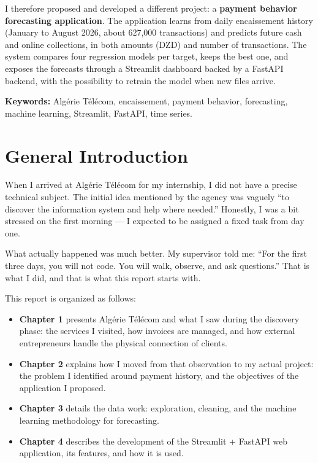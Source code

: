 \documentclass[12pt,a4paper]{report}
\begin{document}
I therefore proposed and developed a different project: a \textbf{payment behavior forecasting application}. The application learns from daily encaissement history (January to August 2026, about 627,000 transactions) and predicts future cash and online collections, in both amounts (DZD) and number of transactions. The system compares four regression models per target, keeps the best one, and exposes the forecasts through a Streamlit dashboard backed by a FastAPI backend, with the possibility to retrain the model when new files arrive.

\textbf{Keywords:} Algérie Télécom, encaissement, payment behavior, forecasting, machine learning, Streamlit, FastAPI, time series.

\tableofcontents
\listoffigures
\listoftables

\chapter{General Introduction}

When I arrived at Algérie Télécom for my internship, I did not have a precise technical subject. The initial idea mentioned by the agency was vaguely ``to discover the information system and help where needed.'' Honestly, I was a bit stressed on the first morning --- I expected to be assigned a fixed task from day one.

What actually happened was much better. My supervisor told me: ``For the first three days, you will not code. You will walk, observe, and ask questions.'' That is what I did, and that is what this report starts with.

This report is organized as follows:

\begin{itemize}[leftmargin=1.2cm]
\item \textbf{Chapter 1} presents Algérie Télécom and what I saw during the discovery phase: the services I visited, how invoices are managed, and how external entrepreneurs handle the physical connection of clients.
\item \textbf{Chapter 2} explains how I moved from that observation to my actual project: the problem I identified around payment history, and the objectives of the application I proposed.
\item \textbf{Chapter 3} details the data work: exploration, cleaning, and the machine learning methodology for forecasting.
\item \textbf{Chapter 4} describes the development of the Streamlit + FastAPI web application, its features, and how it is used.
\end{itemize}
\end{document}
